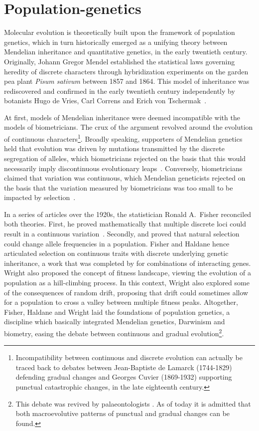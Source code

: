 \section{Population-genetics}
Molecular evolution is theoretically built upon the framework of population genetics, which in turn historically emerged as a unifying theory between Mendelian inheritance and quantitative genetics, in the early twentieth century.
Originally, Johann Gregor Mendel established the statistical laws governing heredity of discrete characters through hybridization experiments on the garden pea plant \textit{Pisum sativum} between 1857 and 1864.
This model of inheritance was rediscovered and confirmed in the early twentieth century independently by botanists Hugo de Vries, Carl Correns and Erich von Tschermak~\citep{dunn2003gregor}.

At first, models of Mendelian inheritance were deemed incompatible with the models of biometricians.
The crux of the argument revolved around the evolution of continuous characters\footnote{Incompatibility between continuous and discrete evolution can actually be traced back to debates between Jean-Baptiste de Lamarck (1744-1829) defending gradual changes and Georges Cuvier (1869-1932) supporting punctual catastrophic changes, in the late eighteenth century.}.
Broadly speaking, supporters of Mendelian genetics held that evolution was driven by mutations transmitted by the discrete segregation of alleles, which biometricians rejected on the basis that this would necessarily imply discontinuous evolutionary leaps~\citep{bowler2003evolution}.
Conversely, biometricians claimed that variation was continuous, which Mendelian geneticists rejected on the basis that the variation measured by biometricians was too small to be impacted by selection~\citep{provine2001origins}.

In a series of articles over the 1920s, the statistician Ronald A.\ Fisher reconciled both theories.
First, he proved mathematically that multiple discrete loci could result in a continuous variation~\citep{fisher1919xv}.
Secondly, \citet{fisher1930genetical} and \citet{haldane1932causes} proved that natural selection could change allele frequencies in a population.
Fisher and Haldane hence articulated selection on continuous traits with discrete underlying genetic inheritance, a work that was completed by \citet{wright1932roles} for combinations of interacting genes.
Wright also proposed the concept of fitness landscape, viewing the evolution of a population as a hill-climbing process.
In this context, Wright also explored some of the consequences of random drift, proposing that drift could sometimes allow for a population to cross a valley between multiple fitness peaks.
Altogether, Fisher, Haldane and Wright laid the foundations of population genetics, a discipline which basically integrated Mendelian genetics, Darwinism and biometry, easing the debate between continuous and gradual evolution\footnote{This debate was revived by palaeontologists \citet*{Gould1972}.
As of today it is admitted that both macroevolutive patterns of punctual and gradual changes can be found.}.

